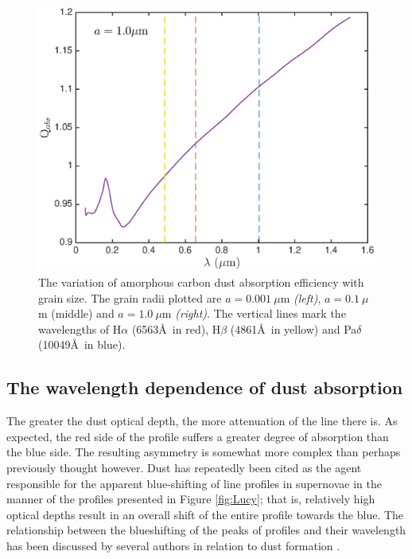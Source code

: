 \documentclass[useAMS,usenatbib,usegraphicx]{mnras}
\begin{document}
\begin{figure}
\includegraphics[trim =48 10 45 15,clip=true,scale=0.35]{Qabs_a1_0}
\caption{The variation of amorphous carbon dust absorption efficiency with grain size. The grain radii plotted are $a=0.001~\mu$m \textit{(left)}, $a=0.1~\mu$m (middle) and $a=1.0~\mu$m \textit{(right)}.  The vertical lines mark the wavelengths of H$\alpha$ (6563\AA\ in red), H$\beta$ (4861\AA\ in yellow) and Pa$\delta$ (10049\AA\ in blue).}
\label{wav_dep2}
\end{figure}






\subsection{The wavelength dependence of dust absorption}
\label{asym}

The greater the dust optical depth, the more attenuation of the line 
there is.  As expected, the red side of the profile suffers a greater 
degree of absorption than the blue side.  The resulting asymmetry is 
somewhat more complex than perhaps previously thought however.  Dust has 
repeatedly been cited as the agent responsible for the apparent 
blue-shifting of line profiles in supernovae in the manner of the profiles 
presented in Figure \ref{fig:Lucy}; that is, relatively high optical 
depths result in an overall shift of the entire profile towards the blue.
 The relationship between the blueshifting of the peaks 
of profiles and their wavelength has been discussed by several authors in 
relation to dust formation \citep{Smith2012, Fransson2013, Gall2014}.  
  
\end{document}

